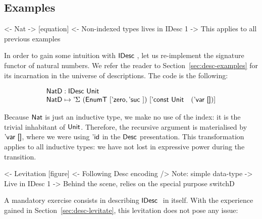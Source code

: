 

\subsection{Examples}
\label{sec:idesc-examples}

\begin{wstructure}
<- Nat
    -> [equation]
    <- Non-indexed types lives in IDesc 1
        -> This applies to all previous examples
\end{wstructure}

In order to gain some intuition with $\IDesc$, let us re-implement the
signature functor of natural numbers. We refer the reader to
Section~\ref{sec:desc-examples} for its incarnation in the universe of
descriptions. The code is the following:

\[\stk{
\NatD : \IDesc{\Unit} \\
\NatD \mapsto \DSigma{(\EnumT [ \NatZero, \NatSuc{} ])}
                     {[ \DConst{\Unit} \quad (\DVar{\Void}) ]}
}\]

Because $\Nat$ is just an inductive type, we make no use of the index:
it is the trivial inhabitant of $\Unit$. Therefore, the recursive
argument is materialised by $\DVar{\Void}$, where we were using $\DId$
in the $\Desc$ presentation. This transformation applies to all
inductive types: we have not lost in expressive power during the
transition.

\begin{wstructure}
<- Levitation [figure]
    <- Following Desc encoding
        /> Note: simple data-type
            -> Live in IDesc 1
    -> Behind the scene, relies on the special purpose switchD
\end{wstructure}

A mandatory exercise consists in describing $\IDesc$ in itself. With
the experience gained in Section~\ref{sec:desc-levitate}, this
levitation does not pose any issue:

